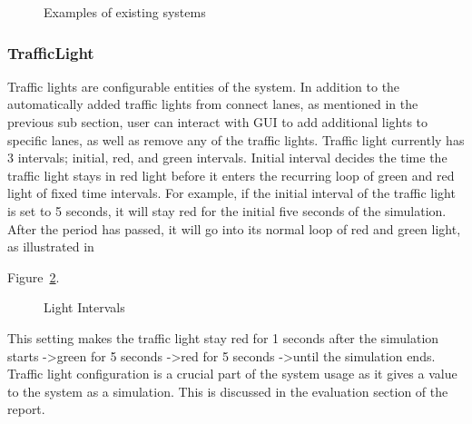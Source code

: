 \documentclass[11pt]{article}
\begin{document}
	\begin{figure}[!htb]
		\centering
		\caption[short for lof]{Examples of existing systems}
		\label{fig:TJunction12}
	\end{figure}
	

\subsubsection{TrafficLight}
Traffic lights are configurable entities of the system. In addition to the automatically added traffic lights from connect lanes, as mentioned in the previous sub section, user can interact with GUI to add additional lights to specific lanes, as well as remove any of the traffic lights.
Traffic light currently has 3 intervals; initial, red, and green intervals. Initial interval decides the time the traffic light stays in red light before it enters the recurring loop of green and red light of fixed time intervals. For example, if the initial interval of the traffic light is set to 5 seconds, it will stay red for the initial five seconds of the simulation. After the period has passed, it will go into its normal loop of red and green light, as illustrated in 

Figure~\ref{fig:lightintervals}.
\begin{figure}[!htb]
\centering
\setlength{\fboxsep}{0pt}%
\setlength{\fboxrule}{1pt}%
\caption{Light Intervals}
\label{fig:lightintervals}
\end{figure}

This setting makes the traffic light stay red for 1 seconds after the simulation starts -\textgreater green for 5 seconds -\textgreater red for 5 seconds -\textgreater until the simulation ends.\\

Traffic light configuration is a crucial part of the system usage as it gives a value to the system as a simulation. This is discussed in the evaluation section of the report.
\end{document}
